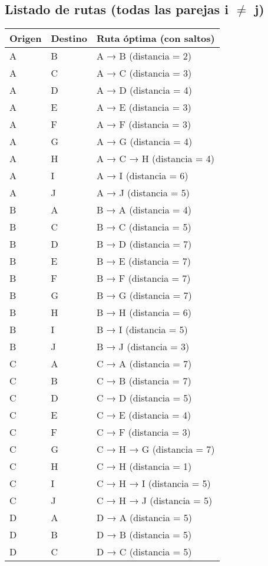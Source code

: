 \documentclass{article}
\begin{document}
\subsection*{Listado de rutas (todas las parejas i $\neq$ j)}
\begin{longtable}{llp{}}
\toprule
\textbf{Origen} & \textbf{Destino} & \textbf{Ruta óptima (con saltos)}\\\midrule
A & B & A → B (distancia = 2)\\
A & C & A → C (distancia = 3)\\
A & D & A → D (distancia = 4)\\
A & E & A → E (distancia = 3)\\
A & F & A → F (distancia = 3)\\
A & G & A → G (distancia = 4)\\
A & H & A → C → H (distancia = 4)\\
A & I & A → I (distancia = 6)\\
A & J & A → J (distancia = 5)\\
B & A & B → A (distancia = 4)\\
B & C & B → C (distancia = 5)\\
B & D & B → D (distancia = 7)\\
B & E & B → E (distancia = 7)\\
B & F & B → F (distancia = 7)\\
B & G & B → G (distancia = 7)\\
B & H & B → H (distancia = 6)\\
B & I & B → I (distancia = 5)\\
B & J & B → J (distancia = 3)\\
C & A & C → A (distancia = 7)\\
C & B & C → B (distancia = 7)\\
C & D & C → D (distancia = 5)\\
C & E & C → E (distancia = 4)\\
C & F & C → F (distancia = 3)\\
C & G & C → H → G (distancia = 7)\\
C & H & C → H (distancia = 1)\\
C & I & C → H → I (distancia = 5)\\
C & J & C → H → J (distancia = 5)\\
D & A & D → A (distancia = 5)\\
D & B & D → B (distancia = 5)\\
D & C & D → C (distancia = 5)\\

\end{longtable}
\end{document}
